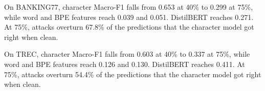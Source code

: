 On BANKING77, character Macro-F1 falls from 0.653 at 40\% to 0.299 at 75\%, while word and BPE features reach 0.039 and 0.051. DistilBERT reaches 0.271. At 75\%, attacks overturn 67.8\% of the predictions that the character model got right when clean.

On TREC, character Macro-F1 falls from 0.603 at 40\% to 0.337 at 75\%, while word and BPE features reach 0.126 and 0.130. DistilBERT reaches 0.411. At 75\%, attacks overturn 54.4\% of the predictions that the character model got right when clean.
